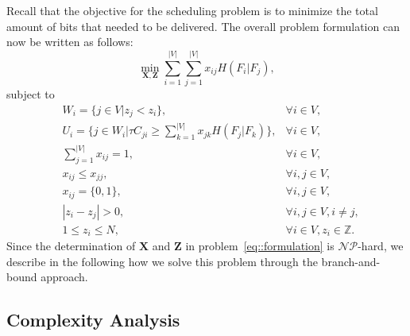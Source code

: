 Recall that the objective for the scheduling problem is to minimize the total amount of bits that needed to be delivered.
The overall problem formulation can now be written as follows:
\begin{equation*}
\underset{\mathbf{X}, \mathbf{Z}}{\min}
\sum_{i=1}^{|V|} \sum_{j=1}^{|V|}  x_{ij} H(F_i|F_j),
\end{equation*}
subject to
\begin{align}
&W_i = \{ j \in V | z_j < z_i \}, &\forall i \in V, \nonumber \\
&U_i = \{ j \in W_i | \tau C_{ji} \geq \sum_{k=1}^{|V|}x_{jk}H(F_j|F_k) \}, &\forall i \in V, \nonumber \\
&\sum_{j=1}^{|V|} x_{ij} = 1, &\forall i \in V, \nonumber \\
&x_{ij} \leq x_{jj}, &\forall i,j \in V, \nonumber \\
&x_{ij} = \{0,1\}, &\forall i,j \in V, \nonumber \\
&|z_i - z_j| > 0, &\forall i,j \in V, i \neq j, \nonumber \\
&1 \leq z_i \leq N, &\forall i \in V, z_i \in \mathbb{Z}.
\label{eq::formulation}
\end{align}
Since the determination of $\mathbf{X}$ and $\mathbf{Z}$ in problem~\eqref{eq::formulation} is $\mathcal{NP}$-hard, we describe in the following how we solve this problem through the branch-and-bound approach.
%
\subsection{Complexity Analysis}